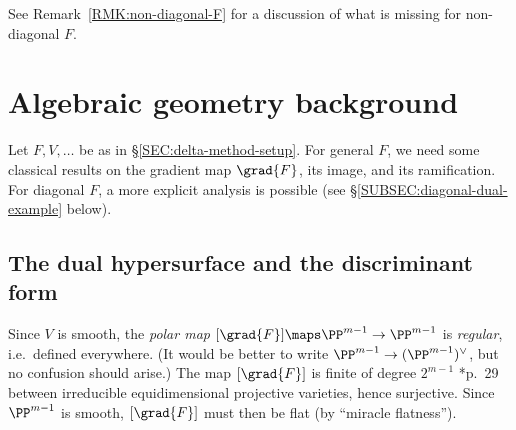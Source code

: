 \documentclass[12pt]{report}
\begin{document}

See Remark~\ref{RMK:non-diagonal-F} for a discussion of what is missing for non-diagonal $F$.

\section{Algebraic geometry background}
\label{SEC:alg-geom-background}

Let $F,V,\dots$ be as in \S\ref{SEC:delta-method-setup}.
For general $F$, we need some classical results on
the gradient map $\grad{F}$, its image, and its ramification.
For diagonal $F$,
a more explicit analysis is possible
(see \S\ref{SUBSEC:diagonal-dual-example} below).

\subsection{The dual hypersurface and the discriminant form}

Since $V$ is smooth,
the \emph{polar map} $[\grad{F}]\maps\PP^{m-1}\to\PP^{m-1}$ is
\emph{regular}, i.e.~defined everywhere.
(It would be better to write $\PP^{m-1}\to(\PP^{m-1})^\vee$,
but no confusion should arise.)
The map $[\grad{F}]$ is finite of degree $2^{m-1}$ \cite{dolgachev2012classical}*{p.~29}
between irreducible equidimensional projective varieties,
hence surjective.
Since $\PP^{m-1}$ is smooth,
$[\grad{F}]$ must then be flat
(by ``miracle flatness'').
\end{document}
